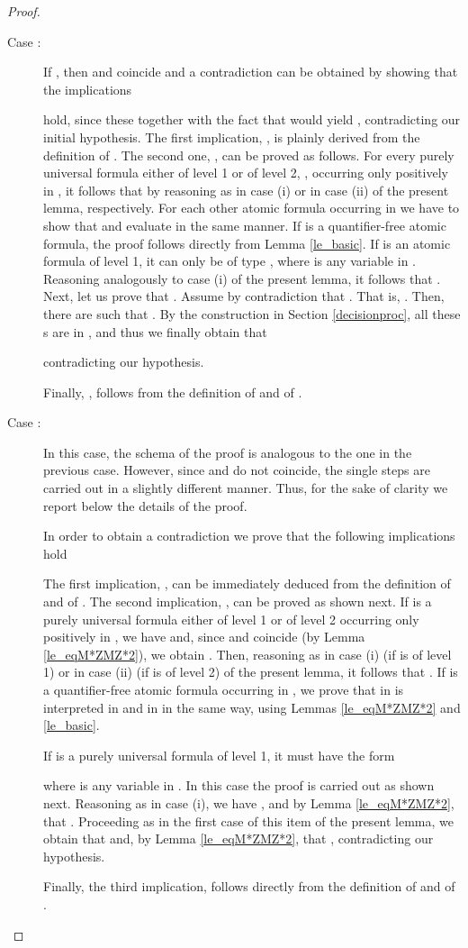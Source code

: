 \documentclass{fundam}
\begin{document}
\begin{proof}
\begin{itemize}
\begin{description}
    \item[Case :]
If , then  and  coincide and a
contradiction can be obtained by showing that the implications

hold, since these together with the fact that  would yield , contradicting our initial
hypothesis.  The first implication,
, is plainly derived from the definition of
.  The second one, , can
be proved as follows.  For every purely universal formula either of
level 1 or of level 2, , occurring only positively
in , it follows that  by
reasoning as in case (i) or in case (ii) of the present lemma, respectively.  For
each other atomic formula  occurring in
 we have to show that  and 
evaluate  in the same manner.  If
 is a quantifier-free atomic formula, the proof
follows directly from Lemma \ref{le_basic}.  If  is
an atomic formula of level 1, it can only be of type , where  is any variable in
.
Reasoning analogously to case (i) of the present lemma, it follows that .  Next,
let us prove that .  Assume by contradiction that .  That is, .  Then, there are 
such that .  By the
construction in Section \ref{decisionproc}, all these s are in
,  and thus we finally obtain that

contradicting our hypothesis.

Finally, , follows from the definition of
 and of .


\item[Case :] In this case, the schema of the proof is
analogous to the one in the previous case.  However, since
 and  do not coincide, the single steps
are carried out in a slightly different manner.  Thus, for the sake of
clarity we report below the details of the proof.

In order to obtain a contradiction we prove that the following
implications hold


The first implication, , can be
immediately deduced from the definition of  and of
.  The second implication,
, can be proved as shown
next.  If  is a purely universal formula either of
level 1 or of level 2 occurring only positively in ,
we have  and,
since  and
 coincide (by Lemma \ref{le_eqM*ZMZ*2}), we obtain
.  Then, reasoning as in case
(i) (if  is of level 1) or in case (ii) (if
 is of level 2) of the present lemma, it follows
that .  If
 is a quantifier-free atomic formula occurring in
, we prove that  in
 is interpreted in  and in
 in the same way, using Lemmas \ref{le_eqM*ZMZ*2} and
\ref{le_basic}.

If  is a purely universal formula of level 1, it
must have the form

where  is any variable in .  In this case the
proof is carried out as shown next.  Reasoning as in case (i), we have , and by Lemma \ref{le_eqM*ZMZ*2}, that
. Proceeding as in the first case of this item of
the present lemma,
we obtain that
 and, by Lemma \ref{le_eqM*ZMZ*2}, that
, contradicting our hypothesis.

Finally, the third implication, 
follows directly from the definition of  and of
.
\end{description}
\end{itemize}
\end{proof}
\end{document}

